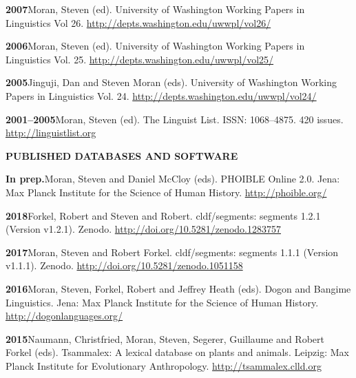 \documentclass[11pt]{article}
\newcommand{\hangpara}{
 \setlength{\parindent}{0in} %
 \hangindent=0.42in %
}
\begin{document}
\vskip 6pt
\hangpara
{\bf 2007}\hspace{1ex}Moran, Steven (ed). University of Washington Working Papers in Linguistics Vol 26. \url{http://depts.washington.edu/uwwpl/vol26/}

\vskip 6pt
\hangpara
{\bf 2006}\hspace{1ex}Moran, Steven (ed). University of Washington Working Papers in Linguistics Vol. 25. \url{http://depts.washington.edu/uwwpl/vol25/}

\vskip 6pt
\hangpara
{\bf 2005}\hspace{1ex}Jinguji, Dan and Steven Moran (eds). University of Washington Working Papers in Linguistics Vol. 24. \url{http://depts.washington.edu/uwwpl/vol24/}

\vskip 6pt
\hangpara
{\bf 2001--2005}\hspace{1ex}Moran, Steven (ed). The Linguist List. ISSN: 1068--4875. 420 issues. \url{http://linguistlist.org}

\vskip 20pt
\begin{flushleft}
{\bf PUBLISHED DATABASES AND SOFTWARE}
\end{flushleft}

\hangpara{\bf In prep.}\hspace{1ex}Moran, Steven and Daniel McCloy (eds). PHOIBLE Online 2.0. Jena: Max Planck Institute for the Science of Human History. \url{http://phoible.org/}

\vskip 6pt
\hangpara{\bf 2018}\hspace{1ex}Forkel, Robert and Steven and Robert. cldf/segments: segments 1.2.1 (Version v1.2.1). Zenodo. \url{http://doi.org/10.5281/zenodo.1283757}

\vskip 6pt
\hangpara{\bf 2017}\hspace{1ex}Moran, Steven and Robert Forkel. cldf/segments: segments 1.1.1 (Version v1.1.1). Zenodo. \url{http://doi.org/10.5281/zenodo.1051158}

\vskip 6pt
\hangpara{\bf 2016}\hspace{1ex}Moran, Steven, Forkel, Robert and Jeffrey Heath (eds). Dogon and Bangime Linguistics. Jena: Max Planck Institute for the Science of Human History. \url{http://dogonlanguages.org/}

\vskip 6pt
\hangpara{\bf 2015}\hspace{1ex}Naumann, Christfried, Moran, Steven, Segerer, Guillaume and Robert Forkel (eds). 
Tsammalex: A lexical database on plants and animals. Leipzig: Max Planck Institute for Evolutionary Anthropology.  \url{http://tsammalex.clld.org}
\end{document}

